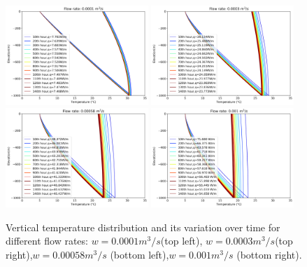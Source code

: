         \begin{figure}[h!]
            \centering
            \includegraphics[width=0.48\textwidth]{Hours_1e-4_1000.png}
            \includegraphics[width=0.48\textwidth]{Hours_3e-4_1000.png}
            \includegraphics[width=0.48\textwidth]{Hours_Best58e-4_1000.png}
            \includegraphics[width=0.48\textwidth]{Hours_1e-3_1000.png}
            \caption{Vertical temperature distribution and its variation over time for different flow rates: $w=0.0001 m^3/s$(top left), $w=0.0003 m^3/s$(top right),$w=0.00058 m^3/s$ (bottom left),$w=0.001 m^3/s$ (bottom right).}
            \label{fig:FR3_dev}
        \end{figure}
        
